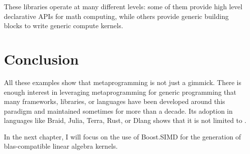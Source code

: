 \documentclass[../main]{subfiles}
\begin{document}
These libraries operate at many different levels: some of them provide
high level declarative APIs for math computing, while others provide generic
building blocks to write generic compute kernels.

\section{
  Conclusion
}

All these examples show that metaprogramming is not just a gimmick.
There is enough interest in leveraging metaprogramming
for generic programming that many frameworks, libraries, or languages
have been developed around this paradigm and maintained sometimes
for more than a decade. Its adoption in languages like Braid, Julia, Terra,
Rust, or Dlang shows that it is not limited to \cpp.

In the next chapter, I will focus on the use of Boost.SIMD \cite{bsimd}
for the generation of \gls{blas}-compatible linear algebra kernels.
\end{document}
